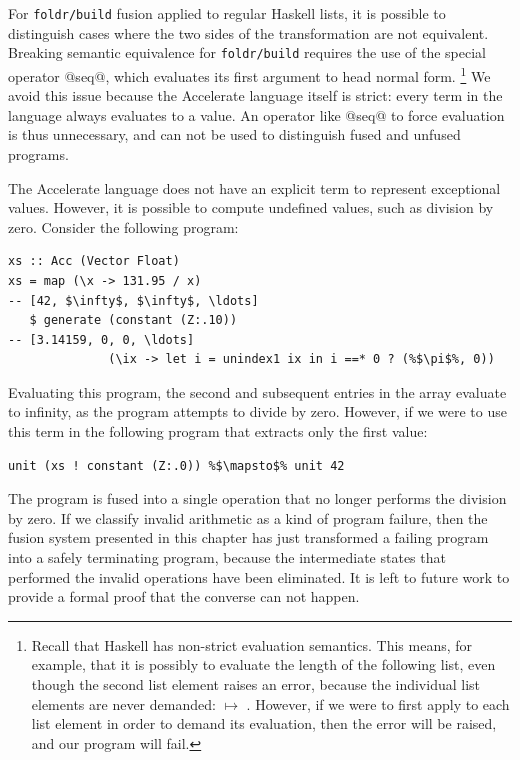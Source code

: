 For \texttt{foldr/build} fusion applied to regular Haskell lists, it is possible
to distinguish cases where the two sides of the transformation are not
equivalent. Breaking semantic equivalence for \texttt{foldr/build} requires the
use of the special operator @seq@, which evaluates its first argument to head
normal form.%
\footnote{Recall that Haskell has non-strict evaluation semantics. This means,
for example, that it is possibly to evaluate the length of the following list,
even though the second list element raises an error, because the individual list
elements are never demanded:  $\mapsto$
. However, if we were to first apply  to each list
element in order to demand its evaluation, then the error will be raised, and
our program will fail.}
We avoid this issue because the Accelerate language itself is strict: every term
in the language always evaluates to a value. An operator like @seq@ to force
evaluation is thus unnecessary, and can not be used to distinguish fused and
unfused programs.

The Accelerate language does not have an explicit term to represent exceptional
values. However, it is possible to compute undefined values, such as division by
zero. Consider the following program:
%
\begin{lstlisting}[style=haskell]
xs :: Acc (Vector Float)
xs = map (\x -> 131.95 / x)                                             -- [42, $\infty$, $\infty$, \ldots]
   $ generate (constant (Z:.10))                                        -- [3.14159, 0, 0, \ldots]
              (\ix -> let i = unindex1 ix in i ==* 0 ? (%$\pi$%, 0))
\end{lstlisting}
%
Evaluating this program, the second and subsequent entries in the array evaluate
to infinity, as the program attempts to divide by zero. However, if we were to
use this term in the following program that extracts only the first value:
%
\begin{lstlisting}[style=haskell]
unit (xs ! constant (Z:.0)) %$\mapsto$% unit 42
\end{lstlisting}
%
The program is fused into a single operation that no longer performs the
division by zero. If we classify invalid arithmetic as a kind of program
failure, then the fusion system presented in this chapter has just transformed a
failing program into a safely terminating program, because the intermediate
states that performed the invalid operations have been eliminated. It is left to
future work to provide a formal proof that the converse can not happen.


